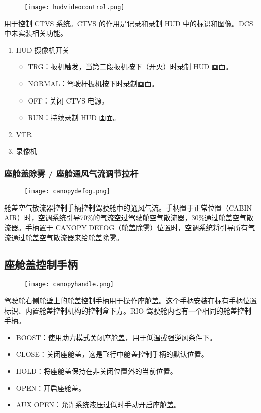 \begin{figure}[htb]
  \center
  \texttt{[image: hudvideocontrol.png]}
\end{figure}
用于控制 CTVS 系统。CTVS 的作用是记录和录制 HUD 中的标识和图像。DCS 中未实装相关功能。

\begin{enumerate}
  \item HUD 摄像机开关
  \begin{itemize}
    \item TRG：扳机触发，当第二段扳机按下（开火）时录制 HUD 画面。
    \item NORMAL：驾驶杆扳机按下时录制画面。
    \item OFF：关闭 CTVS 电源。
    \item RUN：持续录制 HUD 画面。
  \end{itemize}
  \item VTR
  \item 录像机
\end{enumerate}

\subsubsection{座舱盖除雾 / 座舱通风气流调节拉杆}

\begin{figure}[htb]
  \center
  \texttt{[image: canopydefog.png]}
\end{figure}
舱盖空气散流器控制手柄控制驾驶舱中的通风气流。手柄置于正常位置（CABIN AIR）时，空调系统引导70\%的气流空过驾驶舱空气散流器，30\%通过舱盖空气散流器。手柄置于 CANOPY DEFOG（舱盖除雾）位置时，空调系统将引导所有气流通过舱盖空气散流器来给舱盖除雾。

\subsection{座舱盖控制手柄}

\begin{figure}[htb]
  \center
  \texttt{[image: canopyhandle.png]}
\end{figure}
驾驶舱右侧舱壁上的舱盖控制手柄用于操作座舱盖。这个手柄安装在标有手柄位置标识、内置舱盖控制机构的控制盒下方。RIO 驾驶舱内也有一个相同的舱盖控制手柄。

\begin{itemize}
  \item BOOST：使用助力模式关闭座舱盖，用于低温或强逆风条件下。
  \item CLOSE：关闭座舱盖，这是飞行中舱盖控制手柄的默认位置。
  \item HOLD：将座舱盖保持在非关闭位置外的当前位置。
  \item OPEN：开启座舱盖。
  \item AUX OPEN：允许系统液压过低时手动开启座舱盖。
\end{itemize}

